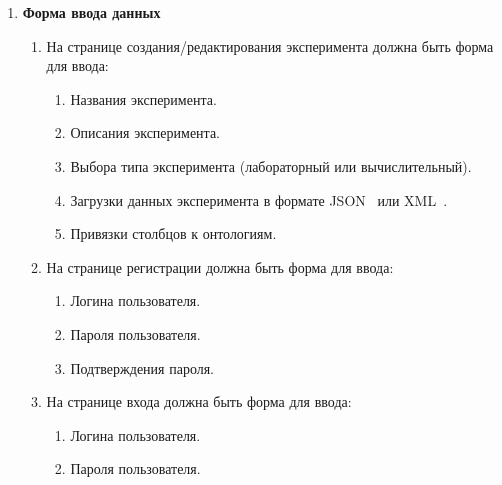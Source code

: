 \documentclass[a4paper,12pt,reqno]{article}
\begin{document}
\begin{enumerate}
        \item \textbf{Форма ввода данных}
        \begin{enumerate}[label=\arabic{enumi}.\arabic*.]
            \item На странице создания/редактирования эксперимента должна быть форма для ввода:
            \begin{enumerate}[label=\arabic{enumi}.\arabic{enumii}.\arabic*.]
                \item Названия эксперимента.
                \item Описания эксперимента.
                \item Выбора типа эксперимента (лабораторный или вычислительный).
                \item Загрузки данных эксперимента в формате JSON~\cite{Format:JSON} или XML~\cite{Format:XML}.
                \item Привязки столбцов к онтологиям.
            \end{enumerate}
            \item На странице регистрации должна быть форма для ввода:
            \begin{enumerate}[label=\arabic{enumi}.\arabic{enumii}.\arabic*.]
                \item Логина пользователя.
                \item Пароля пользователя.
                \item Подтверждения пароля.
            \end{enumerate}
            \item На странице входа должна быть форма для ввода:
            \begin{enumerate}[label=\arabic{enumi}.\arabic{enumii}.\arabic*.]
                \item Логина пользователя.
                \item Пароля пользователя.
            \end{enumerate}
        \end{enumerate}


\end{enumerate}
\end{document}
